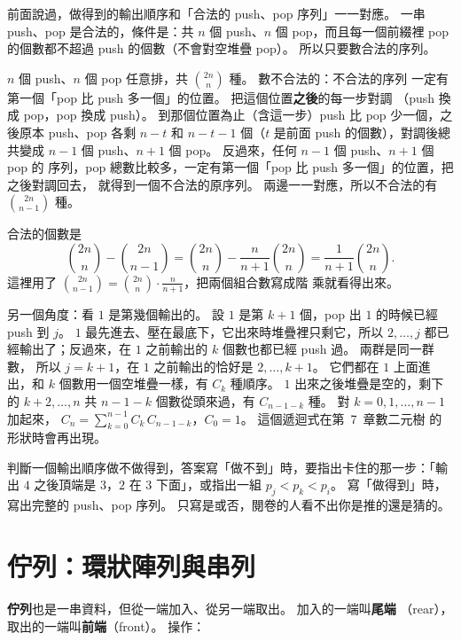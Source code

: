 \begin{whybox}[卡特蘭數]
前面說過，做得到的輸出順序和「合法的 push、pop 序列」一一對應。 一串 push、pop
是合法的，條件是：共 $n$ 個 push、$n$ 個 pop，而且每一個前綴裡 pop 的個數都不超過
push 的個數（不會對空堆疊 pop）。 所以只要數合法的序列。

$n$ 個 push、$n$ 個 pop 任意排，共 $\binom{2n}{n}$ 種。 數不合法的：不合法的序列
一定有第一個「pop 比 push 多一個」的位置。 把這個位置\textbf{之後}的每一步對調
（push 換成 pop，pop 換成 push）。 到那個位置為止（含這一步）push 比 pop 少一個，之
後原本 push、pop 各剩 $n - t$ 和 $n - t - 1$ 個（$t$ 是前面 push 的個數），對調後總共變成
$n - 1$ 個 push、$n + 1$ 個 pop。 反過來，任何 $n - 1$ 個 push、$n + 1$ 個 pop 的
序列，pop 總數比較多，一定有第一個「pop 比 push 多一個」的位置，把之後對調回去，
就得到一個不合法的原序列。 兩邊一一對應，所以不合法的有 $\binom{2n}{n-1}$ 種。

合法的個數是
\[
\binom{2n}{n} - \binom{2n}{n-1}
= \binom{2n}{n} - \frac{n}{n+1}\binom{2n}{n}
= \frac{1}{n+1}\binom{2n}{n}.
\]
這裡用了 $\binom{2n}{n-1} = \binom{2n}{n} \cdot \frac{n}{n+1}$，把兩個組合數寫成階
乘就看得出來。
\end{whybox}

另一個角度：看 $1$ 是第幾個輸出的。 設 $1$ 是第 $k + 1$ 個，pop 出 $1$ 的時候已經
push 到 $j$。 $1$ 最先進去、壓在最底下，它出來時堆疊裡只剩它，所以 $2, \ldots, j$
都已經輸出了；反過來，在 $1$ 之前輸出的 $k$ 個數也都已經 push 過。 兩群是同一群數，
所以 $j = k + 1$，在 $1$ 之前輸出的恰好是 $2, \ldots, k + 1$。 它們都在 $1$ 上面進
出，和 $k$ 個數用一個空堆疊一樣，有 $C_k$ 種順序。 $1$ 出來之後堆疊是空的，剩下的
$k + 2, \ldots, n$ 共 $n - 1 - k$ 個數從頭來過，有 $C_{n-1-k}$ 種。 對 $k = 0, 1,
\ldots, n - 1$ 加起來，
$C_n = \sum_{k=0}^{n-1} C_k\, C_{n-1-k}$，$C_0 = 1$。 這個遞迴式在第~7~章數二元樹
的形狀時會再出現。

\begin{examnote}
判斷一個輸出順序做不做得到，答案寫「做不到」時，要指出卡住的那一步：「輸出 $4$
之後頂端是 $3$，$2$ 在 $3$ 下面」，或指出一組 $p_j < p_k < p_i$。 寫「做得到」時，
寫出完整的 push、pop 序列。 只寫是或否，閱卷的人看不出你是推的還是猜的。
\end{examnote}

\section{佇列：環狀陣列與串列}
\label{sec:sq-queue}

\textbf{佇列}也是一串資料，但從一端加入、從另一端取出。 加入的一端叫\textbf{尾端}
（rear），取出的一端叫\textbf{前端}（front）。 操作：

